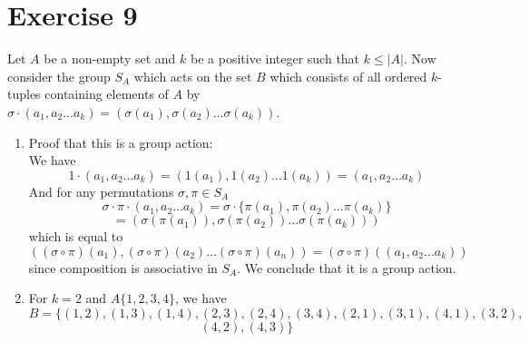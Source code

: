 \documentclass{article}
\begin{document}
    \section*{Exercise 9}
    Let $A$ be a non-empty set and $k$ be a positive integer
    such that $k \leqslant |A|$.
    Now consider the group $S_A$ which acts on the set $B$
    which consists of all ordered $k$-tuples containing elements of $A$
    by $\sigma \cdot (a_1, a_2 \dots a_k) =
    (\sigma(a_1), \sigma(a_2) \dots \sigma(a_k))$. \\
    \begin{enumerate}[label=\textbf{\alph*.}]
        \item 
            Proof that this is a group action: \\
            We have 
            \[ 1 \cdot (a_1, a_2 \dots a_k)
            = (1(a_1), 1(a_2) \dots 1(a_k))
            = (a_1, a_2 \dots a_k) \]
            And for any permutations $\sigma, \pi \in S_A$
            \[ \sigma \cdot \pi \cdot (a_1, a_2 \dots a_k)
            = \sigma \cdot \{\pi(a_1), \pi(a_2) \dots \pi(a_k)\} \]
            \[ = (\sigma(\pi(a_1)), \sigma(\pi(a_2))
            \dots \sigma(\pi(a_k))) \]
            which is equal to
            \[ ((\sigma \circ \pi)(a_1), (\sigma \circ \pi)(a_2)
            \dots (\sigma \circ \pi)(a_n))
            = (\sigma \circ \pi)((a_1, a_2 \dots a_k)) \] 
            since composition is associative in $S_A$. 
            We conclude that it is a group action.
        \item 
            For $k = 2$ and $A \{1, 2, 3, 4\}$,
            we have
            \[ B = \{(1, 2), (1, 3), (1, 4), (2, 3), (2, 4),
            (3, 4), (2, 1), (3, 1), (4, 1), (3, 2), \]
            \[ (4, 2),(4, 3)\} \]
\end{enumerate}
\end{document}

